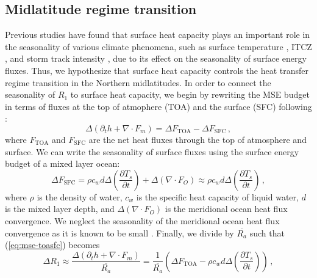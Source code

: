 \documentclass{ametsocV5}
\begin{document}
  
  \subsection{Midlatitude regime transition} \label{subsec:mld}

  Previous studies have found that surface heat capacity plays an important role in the seasonality of various climate phenomena, such as surface temperature \citep{donohoe2014}, ITCZ \citep{bordoni2008}, and storm track intensity \citep{barpanda2020}, due to its effect on the seasonality of surface energy fluxes. Thus, we hypothesize that surface heat capacity controls the heat transfer regime transition in the Northern midlatitudes. In order to connect the seasonality of $R_1$ to surface heat capacity, we begin by rewriting the MSE budget in terms of fluxes at the top of atmophere (TOA) and the surface (SFC) following \cite{barpanda2020}:
  \begin{equation}\label{eq:mse-toasfc}
    \Delta\left(\partial_t h + \nabla\cdot F_{m} \right) = \Delta F_{\mathrm{TOA}} - \Delta F_{\mathrm{SFC}} \, ,
  \end{equation}
  where \(F_{\mathrm{TOA}}\) and \(F_{\mathrm{SFC}}\) are the net heat fluxes through the top of atmosphere and surface. We can write the seasonality of surface fluxes using the surface energy budget of a mixed layer ocean:
  \begin{equation}
    \Delta F_{\mathrm{SFC}} = \rho c_{w} d \Delta\left(\frac{\partial T_{s}}{\partial t}\right) + \Delta ( \nabla\cdot F_{O}) \approx \rho c_{w} d \Delta\left(\frac{\partial T_{s}}{\partial t}\right) \, ,
  \end{equation}
  where $\rho$ is the density of water, $c_w$ is the specific heat capacity of liquid water, $d$ is the mixed layer depth, and $\Delta(\nabla\cdot F_O)$ is the meridional ocean heat flux convergence. We neglect the seasonality of the meridional ocean heat flux convergence as it is known to be small \citep{roberts2017}. Finally, we divide by $\overline{R_a}$ such that (\ref{eq:mse-toasfc}) becomes
  \begin{equation}\label{eq:mse-toasfc-approx}
    \Delta R_1 \approx \frac{\Delta\left(\partial_t h + \nabla\cdot F_{m} \right)}{\overline{R_a}} = \frac{1}{\overline{R_a}} \left(\Delta F_{\mathrm{TOA}} - \rho c_{w} d \Delta\left(\frac{\partial T_{s}}{\partial t}\right)\right) \, , 
  \end{equation}
\end{document}
